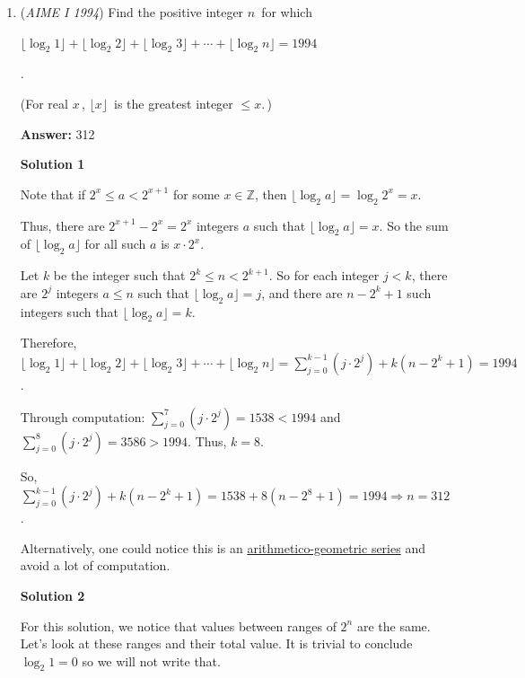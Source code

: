 \begin{enumerate}
 Since $f(19) = 94$ and $T_{19} = 190,$ we see that $K = -96.$ It follows that $f(94) = T_{94} - (-96) = \frac{94\cdot 95}{2} + 96 = 4561,$ so the answer is $\boxed{561}$.

 


	\item (\textit{AIME I 1994}) Find the positive integer $n\,$ for which


 $\lfloor \log_2{1}\rfloor+\lfloor\log_2{2}\rfloor+\lfloor\log_2{3}\rfloor+\cdots+\lfloor\log_2{n}\rfloor=1994$

 .


 (For real $x\,$, $\lfloor x\rfloor\,$ is the greatest integer $\le x.\,$)


 
 \textbf{Answer: }312



\textbf{Solution 1}

Note that if $2^x \le a<2^{x+1}$ for some $x\in\mathbb{Z}$, then $\lfloor\log_2{a}\rfloor=\log_2{2^{x}}=x$. 

 Thus, there are $2^{x+1}-2^{x}=2^{x}$ integers $a$ such that $\lfloor\log_2{a}\rfloor=x$. So the sum of $\lfloor\log_2{a}\rfloor$ for all such $a$ is $x\cdot2^x$. 

 Let $k$ be the integer such that $2^k \le n<2^{k+1}$. So for each integer $j<k$, there are $2^j$ integers $a\le n$ such that $\lfloor\log_2{a}\rfloor=j$, and there are $n-2^k+1$ such integers such that $\lfloor\log_2{a}\rfloor=k$. 

 Therefore, $\lfloor\log_2{1}\rfloor+\lfloor\log_2{2}\rfloor+\lfloor\log_2{3}\rfloor+\cdots+\lfloor\log_2{n}\rfloor= \sum_{j=0}^{k-1}(j\cdot2^j) + k(n-2^k+1) = 1994$. 

 Through computation: $\sum_{j=0}^{7}(j\cdot2^j)=1538<1994$ and $\sum_{j=0}^{8}(j\cdot2^j)=3586>1994$. Thus, $k=8$. 

 So, $\sum_{j=0}^{k-1}(j\cdot2^j) + k(n-2^k+1) = 1538+8(n-2^8+1)=1994 \Rightarrow n = \boxed{312}$.

 Alternatively, one could notice this is an \href{https://artofproblemsolving.com/wiki/index.php?title=Arithmetico-geometric\_series}{arithmetico-geometric series} and avoid a lot of computation.

 



\textbf{Solution 2}

For this solution, we notice that values between ranges of $2^n$ are the same. Let's look at these ranges and their total value. It is trivial to conclude $\log_2{1} = 0$ so we will not write that.


\end{enumerate}
